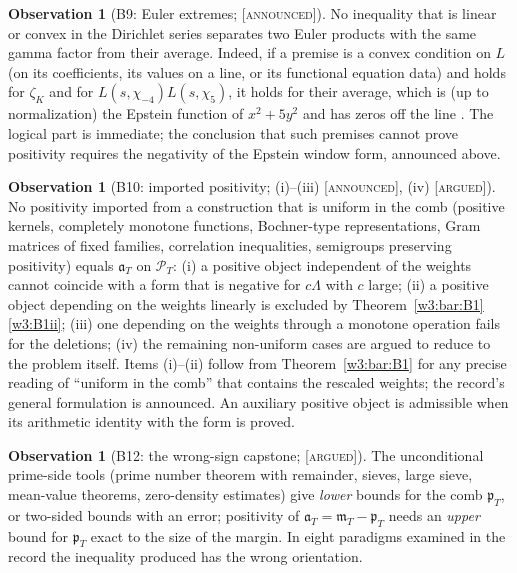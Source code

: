 \documentclass[11pt]{amsart}
\theoremstyle{definition}
\newtheorem{observation}[theorem]{Observation}
\theoremstyle{remark}
\numberwithin{equation}{section}
\newcommand{\PT}{\mathcal{P}_T}                        %
\newcommand{\mT}{\mathfrak{m}_T}                       %
\newcommand{\pT}{\mathfrak{p}_T}                       %
\newcommand{\aT}{\mathfrak{a}_T}                       %
\newcommand{\stag}[1]{\textsc{[#1]}}
\newcommand{\ARGUED}{\stag{argued}}
\newcommand{\ANNOUNCED}{\stag{announced}}
\begin{document}
\begin{observation}[B9: Euler extremes; \ANNOUNCED]\label{w3:bar:B9}
No inequality that is linear or convex in the Dirichlet series separates two Euler products with the same gamma
factor from their average. Indeed, if a premise is a convex condition on $L$ (on its coefficients, its values on
a line, or its functional equation data) and holds for $\zeta_K$ and for $L(s,\chi_{-4})L(s,\chi_5)$, it holds for
their average, which is (up to normalization) the Epstein function of $x^2+5y^2$ and has zeros off the line
\cite{DavenportHeilbronn1936}. The logical part is immediate; the conclusion that such premises cannot prove
positivity requires the negativity of the Epstein window form, announced above.
\end{observation}

\begin{observation}[B10: imported positivity; (i)--(iii) \ANNOUNCED, (iv) \ARGUED]\label{w3:bar:B10}
No positivity imported from a construction that is uniform in the comb (positive kernels, completely monotone
functions, Bochner-type representations, Gram matrices of fixed families, correlation inequalities, semigroups
preserving positivity) equals $\aT$ on $\PT$: (i) a positive object independent of the weights cannot coincide with a
form that is negative for $c\Lambda$ with $c$ large; (ii) a positive object depending on the weights linearly is
excluded by Theorem~\ref{w3:bar:B1}\ref{w3:B1ii}; (iii) one depending on the weights through a monotone operation
fails for the deletions; (iv) the remaining non-uniform cases are argued to reduce to the
problem itself. Items (i)--(ii) follow from Theorem~\ref{w3:bar:B1} for any precise reading of ``uniform in the comb'' that contains the rescaled weights;
the record's general formulation is announced. An auxiliary positive object is admissible when its arithmetic identity
with the form is proved.
\end{observation}

\begin{observation}[B12: the wrong-sign capstone; \ARGUED]\label{w3:bar:B12}
The unconditional prime-side tools (prime number theorem with remainder, sieves, large sieve, mean-value
theorems, zero-density estimates) give \emph{lower} bounds for the comb $\pT$, or two-sided bounds with an error;
positivity of $\aT=\mT-\pT$ needs an \emph{upper} bound for $\pT$ exact to the size of the margin. In eight
paradigms examined in the record the inequality produced has the wrong orientation.
\end{observation}
\end{document}

